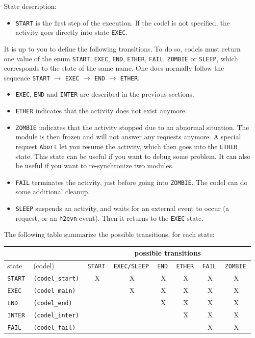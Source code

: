 \bigbreak

State description:

\begin{itemize}
\item \texttt{START} is the first step of the execution. If the codel is not
specified, the activity goes directly into state \texttt{EXEC}.
\end{itemize}

It is up  to you to define the   following transitions. To  do so, codels
must return one value of  the enum \texttt{START},  \texttt{EXEC}, \texttt{END},
\texttt{ETHER},  \texttt{FAIL}, \texttt{ZOMBIE} or \texttt{SLEEP}, which corresponds
to the state of the same name. One does normally follow the sequence 
\texttt{START} $\rightarrow$ \texttt{EXEC} $\rightarrow$  \texttt{END} $\rightarrow$
\texttt{ETHER}.

\begin{itemize}
\item \texttt{EXEC}, \texttt{END} and \texttt{INTER} are described in the previous
sections.

\item \texttt{ETHER} indicates that the activity does not exist anymore.

\item \texttt{ZOMBIE} indicates that the activity stopped due to an abnormal
situation. The module  is then  frozen and  will not answer  any requests
anymore. A special request \texttt{Abort} let you resume the activity, which
then  goes into the  \texttt{ETHER} state. This  state can  be useful if you
want  to debug  some problem.  It   can also be  useful   if you want  to
re-synchronize two modules.

\item \texttt{FAIL} terminates the activity, just before going into 
\texttt{ZOMBIE}. The codel can do some additional cleanup.

\item \texttt{SLEEP} suspends an activity, and waits for an external event
to occur (a request,  or an \texttt{h2evn} event). Then  it returns  to the
\texttt{EXEC} state.
\end{itemize}

The following table summarize the possible transitions, for each state:

\bigbreak

{\small\begin{tabular}{|ll||c|c|c|c|c|c|}
\cline{3-8}
\multicolumn{2}{c}{} & \multicolumn{6}{|c|}{possible transitions} \\
\hline
state & (codel) & \tt START & \tt EXEC/SLEEP & \tt END & \tt ETHER & \tt FAIL & \tt ZOMBIE \\
\hline
\tt START  & \tt (codel\_start)	& X & X & X & X & X & X \\
\tt EXEC   & \tt (codel\_main) 	&   & X & X & X & X & X \\
\tt END    & \tt (codel\_end) 	&   &   & X & X & X & X \\
\tt INTER  & \tt (codel\_inter) &   &   &   & X & X & X \\
\tt FAIL   & \tt (codel\_fail) 	&   &   &   &   & X & X \\
\hline
\end{tabular}}

